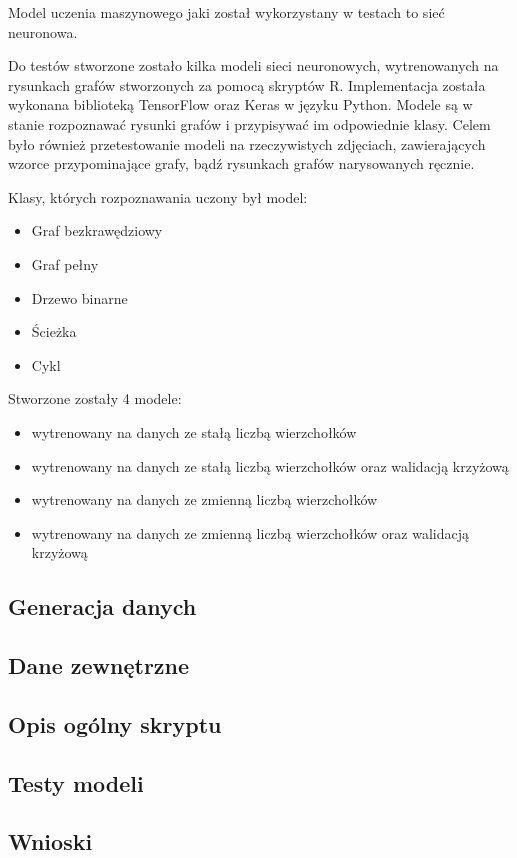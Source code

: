 Model uczenia maszynowego jaki został wykorzystany w testach to sieć neuronowa.

Do testów stworzone zostało kilka modeli sieci neuronowych,
wytrenowanych na rysunkach grafów stworzonych za pomocą skryptów R.
Implementacja została wykonana biblioteką TensorFlow oraz Keras w języku Python.
Modele są w stanie rozpoznawać rysunki grafów i przypisywać im odpowiednie klasy.
Celem było również przetestowanie modeli na rzeczywistych zdjęciach,
zawierających wzorce przypominające grafy, bądź rysunkach grafów narysowanych ręcznie.

Klasy, których rozpoznawania uczony był model:
\begin{itemize}[label=-,labelsep=0.4cm,leftmargin=0.6cm]
	\item Graf bezkrawędziowy
	\item Graf pełny
	\item Drzewo binarne
	\item Ścieżka
	\item Cykl
\end{itemize}

Stworzone zostały 4 modele:
\begin{itemize}[label=-,labelsep=0.4cm,leftmargin=0.6cm]
	\item wytrenowany na danych ze stałą liczbą wierzchołków
	\item wytrenowany na danych ze stałą liczbą wierzchołków oraz walidacją krzyżową
	\item wytrenowany na danych ze zmienną liczbą wierzchołków
	\item wytrenowany na danych ze zmienną liczbą wierzchołków oraz walidacją krzyżową
\end{itemize}

\subsection{Generacja danych}


\subsection{Dane zewnętrzne}


\subsection{Opis ogólny skryptu}


\subsection{Testy modeli}


\subsection{Wnioski}

